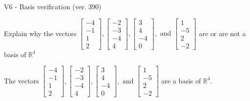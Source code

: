 \begin{exercise}
  \begin{exerciseTitle}V6 - Basis verification (ver. 390)\end{exerciseTitle}
  \begin{exerciseStatement}
    Explain why the vectors \(\left[\begin{array}{r}
-4 \\
-1 \\
1 \\
2
\end{array}\right] , \left[\begin{array}{r}
-2 \\
-3 \\
-4 \\
4
\end{array}\right] , \left[\begin{array}{r}
3 \\
4 \\
-4 \\
0
\end{array}\right] , \text{ and } \left[\begin{array}{r}
1 \\
-5 \\
2 \\
-2
\end{array}\right]\) are or are not a basis of \(\mathbb{R}^4\)	


  \end{exerciseStatement}
  \begin{exerciseAnswer}
   The vectors \(\left[\begin{array}{r}
-4 \\
-1 \\
1 \\
2
\end{array}\right] , \left[\begin{array}{r}
-2 \\
-3 \\
-4 \\
4
\end{array}\right] , \left[\begin{array}{r}
3 \\
4 \\
-4 \\
0
\end{array}\right] , \text{ and } \left[\begin{array}{r}
1 \\
-5 \\
2 \\
-2
\end{array}\right]\) 
  	 are  a basis of \(\mathbb{R}^4\).
  


  \end{exerciseAnswer}
\end{exercise}